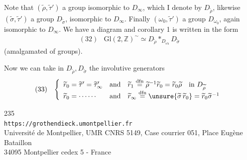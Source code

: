 Note that $(\widetilde\rho,\widetilde\tau')$  a group isomorphic to $D_\infty$, which I denote by $D_{\widetilde\rho}$,
likewise $(\widetilde\sigma,\widetilde\tau')$  a group $D_{\widetilde\sigma}$,
isomorphic to $D_\infty$. Finally $(\omega_0,\widetilde\tau')$  a group $D_{\omega_0}$, again isomorphic to $D_\infty$. We have a diagram
and corollary 1 is written in the form
\[
\begin{array}{ll}
(32)&\mathrm{Gl}(2,\mathbb Z)^{\sim}\simeq D_{\widetilde\rho}*_{D_{\omega_0}}D_{\widetilde\sigma}
\end{array}
\]
(amalgamated  of groups).

Now we can take in $D_{\widetilde\rho},D_{\widetilde\sigma}$ the involutive generators
\[
\begin{array}{ll}
(33)&\left\{\begin{array}{lll}
\widetilde r_0=\widetilde\tau'=\widetilde\tau'_\infty&\text{and}&
\widetilde r_1\overset{\mathrm{dfn}}{=}\widetilde\rho^{-1}\widetilde r_0=\widetilde r_0\widetilde\rho\quad\text{in }D_{\widetilde\rho}\\
\widetilde r_0=\cdots\cdots&\text{and}&
\widetilde r_\infty\overset{\mathrm{dfn}}{=}\unsure{\widetilde\sigma\,\widetilde r_0}=\widetilde r_0\widetilde\sigma^{-1}
\end{array}\right.
\end{array}
\]


\begin{center}
235\\
\texttt{https://grothendieck.umontpellier.fr}\\
Université de Montpellier, UMR CNRS 5149, Case courrier 051, Place Eugène Bataillon\\
34095 Montpellier cedex 5 - France
\end{center}


